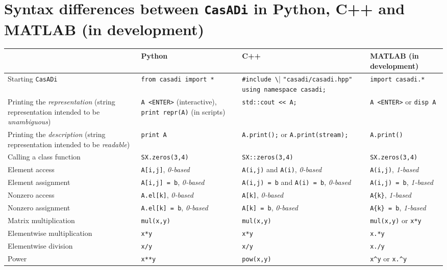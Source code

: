 \documentclass[a4paper,12pt]{book}
\newcommand{\CasADi}{\texttt{CasADi}\xspace}
\begin{document}
\chapter{Syntax differences between \CasADi in Python, C++ and MATLAB (in development)} \label{ch:syntax_differences}
\scriptsize
\begin{center}
  \begin{tabular}{| p{3.5cm} | p{3.5cm} | p{3.5cm} | p{3.5cm} | }
    \hline
      & Python & C++ & MATLAB (in development) \\ \hline
    Starting \CasADi & \verb|from casadi import *| & \verb|#include \| \verb|"casadi/casadi.hpp"| \verb|using namespace casadi;| & \verb|import casadi.*| \\ \hline
    Printing the \emph{representation} (string representation intended to be \emph{unambiguous}) & \verb|A <ENTER>| (interactive), \verb|print repr(A)| (in scripts) & \verb|std::cout << A;|& \verb|A <ENTER>| or \verb|disp A|\\ \hline
    Printing the \emph{description} (string representation intended to be \emph{readable}) & \verb|print A| & \verb|A.print();| or \verb|A.print(stream);|& \verb|A.print()| \\ \hline
    Calling a class function & \verb|SX.zeros(3,4)| & \verb|SX::zeros(3,4)| & \verb|SX.zeros(3,4)|\\ \hline
    Element access & \verb|A[i,j]|, \emph{0-based} & \verb|A(i,j)| and \verb|A(i)|, \emph{0-based} & \verb|A(i,j)|, \emph{1-based} \\ \hline
    Element assignment & \verb|A[i,j] = b|, \emph{0-based} & \verb|A(i,j) = b| and \verb|A(i) = b|, \linebreak \emph{0-based} & \verb|A(i,j) = b|, \emph{1-based} \\ \hline
    Nonzero access & \verb|A.el[k]|, \emph{0-based} & \verb|A[k]|, \emph{0-based} & \verb|A{k}|, \emph{1-based} \\ \hline
    Nonzero assignment & \verb|A.el[k] = b|, \emph{0-based} & \verb|A[k] = b|, \emph{0-based} & \verb|A{k} = b|, \emph{1-based} \\ \hline
    Matrix multiplication & \verb|mul(x,y)| & \verb|mul(x,y)| & \verb|mul(x,y)| or \verb|x*y| \\ \hline
    Elementwise multiplication & \verb|x*y| & \verb|x*y| & \verb|x.*y| \\ \hline
    Elementwise division & \verb|x/y| & \verb|x/y| & \verb|x./y| \\ \hline
    Power & \verb|x**y| & \verb|pow(x,y)| & \verb|x^y| or \verb|x.^y| \\ \hline

\end{tabular}
\end{center}
\end{document}
